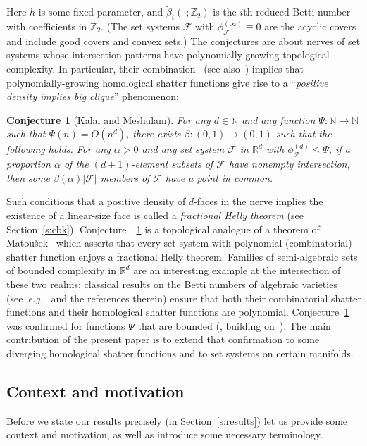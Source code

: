 \documentclass[11pt]{article}
\newcommand{\R}{\mathbb{R}}
\newcommand{\Z}{\mathbb{Z}}
\newcommand{\N}{\mathbb{N}}
\newcommand{\F}{\mathcal{F}}
\newtheorem{conjecture}[theorem]{Conjecture}
\begin{document}
%
\noindent
Here $h$ is some fixed parameter, and $\tilde\beta_i(\cdot;\Z_2)$ is the $i$th reduced Betti number with coefficients in $\Z_2$. (The set systems $\F$ with $\phi_{\F}^{(\infty)} \equiv 0$ are the acyclic covers and include good covers and convex sets.) The  conjectures are about nerves of set systems whose intersection patterns have polynomially-growing topological complexity. In particular, their combination~\cite[Conjectures~6~and~7]{KM} (see also~\cite[Conjecture~1.9]{steppingUp}) implies that polynomially-growing homological shatter functions give rise to a ``\emph{positive density implies big clique}'' phenomenon:
%
\begin{conjecture}[Kalai and Meshulam]
    \label{conj:kalai-meshulam}
    For any $d \in \N$ and any function $\Psi: \N \to \N$ such that $\Psi(n) = O(n^d)$, there exists $\beta: (0,1) \to (0,1)$ such that the following holds. For any $\alpha>0$ and any set system $\F$ in $\R^d$ with $\phi_{\F}^{(d)} \le \Psi$, if a proportion $\alpha$ of the $(d+1)$-element subsets of $\F$ have nonempty intersection, then some $\beta(\alpha)|\F|$ members of $\F$ have a point in common.
\end{conjecture}
%
\noindent
Such conditions that a positive density of $d$-faces in the nerve implies the existence of a linear-size face is called a \emph{fractional Helly theorem} (see Section~\ref{s:cbk}).
%
\medskip
%
Conjecture~~\ref{conj:kalai-meshulam} is a topological analogue of a theorem of Matou\v sek~\cite{matousek2004bounded} which asserts that every set system with polynomial (combinatorial) shatter function enjoys a fractional Helly theorem. Families of semi-algebraic sets of bounded complexity in $\R^d$ are an interesting example at the intersection of these two realms: classical results on the Betti numbers of algebraic varieties (see~\emph{e.g.}~\cite{basu2018multi} and the references therein) ensure that both their combinatorial shatter functions and their homological shatter functions are polynomial.
%
\medskip
%
Conjecture~\ref{conj:kalai-meshulam} was confirmed for functions $\Psi$ that are bounded (\cite[Corollary~1.3]{steppingUp}, building on~\cite{Holmsen2020,Holmsen2021,patakova2022bounding}). The main contribution of the present paper is to extend that confirmation to some diverging homological shatter functions and to set systems on certain manifolds. 
%
%
\subsection{Context and motivation}\label{s:context}
%
Before we state our results precisely (in Section~\ref{s:results}) let us provide some context and motivation, as well as introduce some necessary terminology.
%
%
\end{document}
